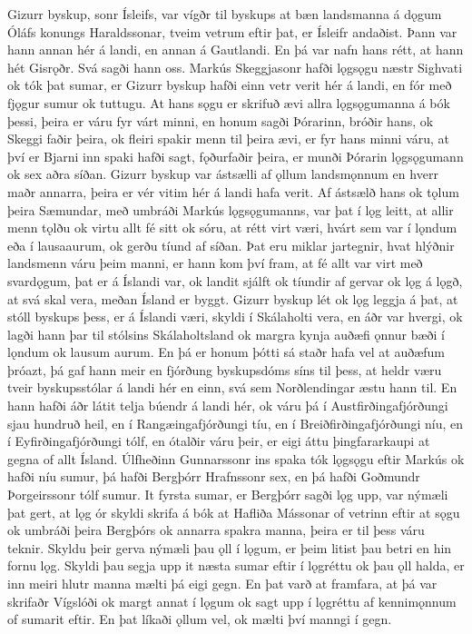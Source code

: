 Gizurr byskup, sonr Ísleifs, var vígðr til byskups at bæn landsmanna á dǫgum Óláfs konungs Haraldssonar, tveim vetrum eftir þat, er Ísleifr andaðist. Þann var hann annan hér á landi, en annan á Gautlandi. En þá var nafn hans rétt, at hann hét Gisrǫðr. Svá sagði hann oss.
Markús Skeggjasonr hafði lǫgsǫgu næstr Sighvati ok tók þat sumar, er Gizurr byskup hafði einn vetr verit hér á landi, en fór með fjǫgur sumur ok tuttugu. At hans sǫgu er skrifuð ævi allra lǫgsǫgumanna á bók þessi, þeira er váru fyr várt minni, en honum sagði Þórarinn, bróðir hans, ok Skeggi faðir þeira, ok fleiri spakir menn til þeira ævi, er fyr hans minni váru, at því er Bjarni inn spaki hafði sagt, fǫðurfaðir þeira, er munði Þórarin lǫgsǫgumann ok sex aðra síðan.
Gizurr byskup var ástsælli af ǫllum landsmǫnnum en hverr maðr annarra, þeira er vér vitim hér á landi hafa verit. Af ástsælð hans ok tǫlum þeira Sæmundar, með umbráði Markús lǫgsǫgumanns, var þat í lǫg leitt, at allir menn tǫlðu ok virtu allt fé sitt ok sóru, at rétt virt væri, hvárt sem var í lǫndum eða í lausaaurum, ok gerðu tíund af síðan. Þat eru miklar jartegnir, hvat hlýðnir landsmenn váru þeim manni, er hann kom því fram, at fé allt var virt með svardǫgum, þat er á Íslandi var, ok landit sjálft ok tíundir af gervar ok lǫg á lǫgð, at svá skal vera, meðan Ísland er byggt.
Gizurr byskup lét ok lǫg leggja á þat, at stóll byskups þess, er á Íslandi væri, skyldi í Skálaholti vera, en áðr var hvergi, ok lagði hann þar til stólsins Skálaholtsland ok margra kynja auðæfi ǫnnur bæði í lǫndum ok lausum aurum.
En þá er honum þótti sá staðr hafa vel at auðæfum þróazt, þá gaf hann meir en fjórðung byskupsdóms síns til þess, at heldr væru tveir byskupsstólar á landi hér en einn, svá sem Norðlendingar æstu hann til. En hann hafði áðr látit telja búendr á landi hér, ok váru þá í Austfirðingafjórðungi sjau hundruð heil, en í Rangæingafjórðungi tíu, en í Breiðfirðingafjórðungi níu, en í Eyfirðingafjórðungi tólf, en ótalðir váru þeir, er eigi áttu þingfararkaupi at gegna of allt Ísland.
Úlfheðinn Gunnarssonr ins spaka tók lǫgsǫgu eftir Markús ok hafði níu sumur, þá hafði Bergþórr Hrafnssonr sex, en þá hafði Goðmundr Þorgeirssonr tólf sumur.
It fyrsta sumar, er Bergþórr sagði lǫg upp, var nýmæli þat gert, at lǫg ór skyldi skrifa á bók at Hafliða Mássonar of vetrinn eftir at sǫgu ok umbráði þeira Bergþórs ok annarra spakra manna, þeira er til þess váru teknir. Skyldu þeir gerva nýmæli þau ǫll í lǫgum, er þeim litist þau betri en hin fornu lǫg. Skyldi þau segja upp it næsta sumar eftir í lǫgréttu ok þau ǫll halda, er inn meiri hlutr manna mælti þá eigi gegn. En þat varð at framfara, at þá var skrifaðr Vígslóði ok margt annat í lǫgum ok sagt upp í lǫgréttu af kennimǫnnum of sumarit eftir. En þat líkaði ǫllum vel, ok mælti því manngi í gegn.
